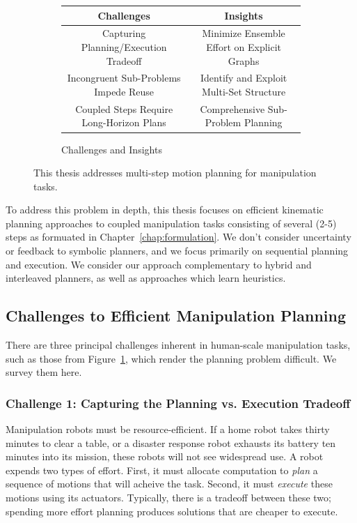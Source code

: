 \begin{figure}
{\begin{widepage}
   \vspace{0.1in}
   \begin{subfigure}[t]{\textwidth}
      \centering
      \begin{tabular}{cc}
         \toprule
         Challenges & Insights \\
         \midrule
         Capturing Planning/Execution Tradeoff
            & Minimize Ensemble Effort on Explicit Graphs \\
         Incongruent Sub-Problems Impede Reuse
            & Identify and Exploit Multi-Set Structure \\
         Coupled Steps Require Long-Horizon Plans
            & Comprehensive Sub-Problem Planning \\
         \bottomrule
      \end{tabular}
      \caption{Challenges and Insights}
   \end{subfigure}
   \caption{This thesis addresses multi-step motion planning
      for manipulation tasks.}
   \label{fig:intro-examples}
\end{widepage}
}%
\end{figure}

To address this problem in depth,
this thesis focuses on
efficient kinematic planning approaches
to coupled manipulation tasks consisting of several (2-5) steps
as formuated in Chapter~\ref{chap:formulation}.
We don't consider uncertainty
or feedback to symbolic planners,
and we focus primarily on sequential planning and execution.
We consider our approach complementary to
hybrid and interleaved planners,
as well as approaches which learn heuristics.

\subsection*{Challenges to Efficient Manipulation Planning}

There are three principal challenges inherent in
human-scale manipulation tasks,
such as those from Figure~\ref{fig:intro-examples},
which render the planning problem difficult.
We survey them here.

\subsubsection*{Challenge 1:
   Capturing the Planning vs. Execution Tradeoff}

Manipulation robots must be resource-efficient.
If a home robot takes thirty minutes to clear a table,
or a disaster response robot exhausts its battery ten minutes
into its mission,
these robots will not see widespread use.
A robot expends two types of effort.
First, it must allocate computation to \emph{plan}
a sequence of motions that will acheive the task.
Second, it must \emph{execute} these motions using its actuators.
Typically, there is a tradeoff between these two;
spending more effort planning produces solutions that are
cheaper to execute.

